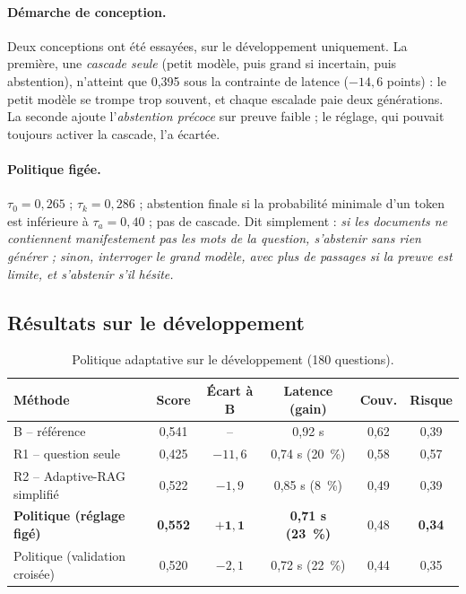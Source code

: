 \documentclass[11pt,a4paper]{article}
\begin{document}
\paragraph{Démarche de conception.} Deux conceptions ont été essayées, sur le développement
uniquement. La première, une \emph{cascade seule} (petit modèle, puis grand si incertain, puis
abstention), n'atteint que 0,395 sous la contrainte de latence ($-14{,}6$ points) : le petit modèle se
trompe trop souvent, et chaque escalade paie deux générations. La seconde ajoute l'\emph{abstention
précoce} sur preuve faible ; le réglage, qui pouvait toujours activer la cascade, l'a écartée.

\paragraph{Politique figée.} $\tau_0 = 0{,}265$ ; $\tau_k = 0{,}286$ ; abstention finale si la
probabilité minimale d'un token est inférieure à $\tau_a = 0{,}40$ ; pas de cascade. Dit simplement :
\emph{si les documents ne contiennent manifestement pas les mots de la question, s'abstenir sans rien
générer ; sinon, interroger le grand modèle, avec plus de passages si la preuve est limite, et
s'abstenir s'il hésite.}

\subsection{Résultats sur le développement}

\begin{table}[H]
\centering\small
\begin{tabular}{l c c c c c}
\toprule
\textbf{Méthode} & \textbf{Score} & \textbf{Écart à B} & \textbf{Latence (gain)} & \textbf{Couv.} & \textbf{Risque} \\
\midrule
B -- référence & 0,541 & -- & 0,92 s & 0,62 & 0,39 \\
R1 -- question seule & 0,425 & $-11{,}6$ & 0,74 s (20~\%) & 0,58 & 0,57 \\
R2 -- Adaptive-RAG simplifié & 0,522 & $-1{,}9$ & 0,85 s (8~\%) & 0,49 & 0,39 \\
\textbf{Politique (réglage figé)} & \textbf{0,552} & $\mathbf{+1{,}1}$ & \textbf{0,71 s (23~\%)} & 0,48 & \textbf{0,34} \\
Politique (validation croisée) & 0,520 & $-2{,}1$ & 0,72 s (22~\%) & 0,44 & 0,35 \\
\bottomrule
\end{tabular}
\caption{Politique adaptative sur le développement (180 questions).}
\label{tab:dev}
\end{table}
\end{document}
